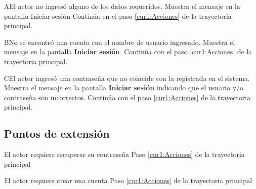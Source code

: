 \begin{UCtrayectoriaA}{A}{El actor no ingresó alguno de los datos requeridos.}
\UCpaso[\UCsist] Muestra el mensaje  en la pantalla \textbf{}{Iniciar sesión}
\UCpaso[] Continúa en el paso \ref{cur1:Acciones} de la trayectoria principal.
\end{UCtrayectoriaA}

\begin{UCtrayectoriaA}{B}{No se encontró una cuenta con el nombre de usuario ingresado.}
\UCpaso[\UCsist] Muestra el mensaje  en la pantalla \textbf{Iniciar sesión}.
\UCpaso[] Continúa con el paso \ref{cur1:Acciones} de la trayectoria principal.
\end{UCtrayectoriaA}

\begin{UCtrayectoriaA}{C}{El actor ingresó una contraseña que no coincide con la registrada en el sistema.}
\UCpaso[\UCsist] Muestra el mensaje  en la pantalla \textbf{Iniciar sesión} indicando que el usuario y/o contraseña son incorrectos.
\UCpaso[] Continúa con el paso \ref{cur1:Acciones} de la trayectoria principal.
\end{UCtrayectoriaA} 



\subsection{Puntos de extensión}

\UCExtensionPoint
{El actor requiere recuperar su contraseña}
{ Paso \ref{cur1:Acciones} de la trayectoria principal}
{}

\UCExtensionPoint
{El actor requiere crear una cuenta}
{ Paso \ref{cur1:Acciones} de la trayectoria principal}
{}